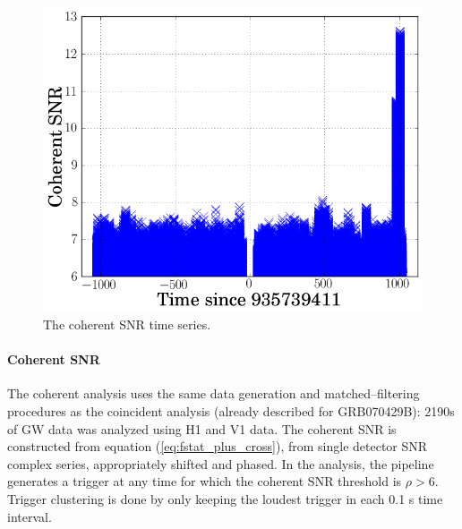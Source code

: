 \begin{figure}[ht]
\centering
\includegraphics[scale=0.45]{Images/cohSNR.png}
\caption{The coherent SNR time series.}
\label{cohnull}
\end{figure}

\paragraph{Coherent SNR}
The coherent analysis uses the same data generation and matched--filtering procedures as the coincident analysis (already described for GRB070429B): 2190s of GW data was analyzed using H1 and V1 data. The coherent SNR is constructed from equation (\ref{eq:fstat_plus_cross}), from single detector SNR complex series, appropriately shifted and phased. In the analysis, the pipeline generates a trigger at any time for which the coherent SNR threshold is $\rho > 6$. Trigger clustering is done by only keeping the loudest trigger in each 0.1 s time interval.

